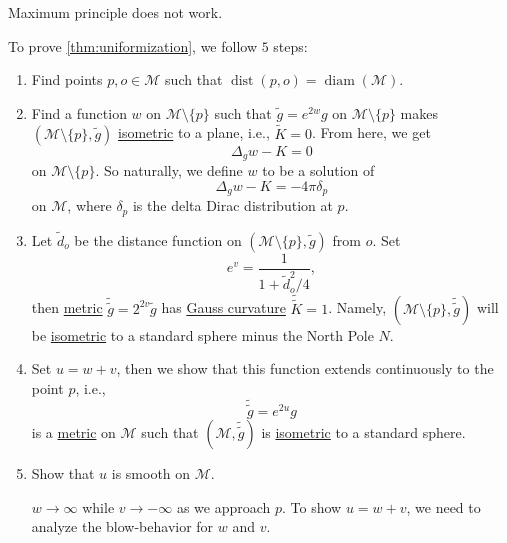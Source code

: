 \begin{note}
	Maximum principle does not work.
\end{note}

To prove \autoref{thm:uniformization}, we follow \(5\) steps:
\begin{enumerate}
	\item Find points \(p, o\in \mathcal{M} \) such that \(\mathop{\mathrm{dist}}(p, o) = \mathop{\mathrm{diam}}(\mathcal{M} ) \).
	\item Find a function \(w\) on \(\mathcal{M} \setminus \{ p \} \) such that \(\widetilde{g} = e^{2w} g\) on \(\mathcal{M} \setminus \{ p \} \) makes \((\mathcal{M} \setminus \{ p \} , \widetilde{g} )\) \hyperref[def:isometry]{isometric} to a plane, i.e., \(\widetilde{K} = 0\). From here, we get
	      \[
		      \Delta _g w - K = 0
	      \]
	      on \(\mathcal{M} \setminus \{ p \} \). So naturally, we define \(w\) to be a solution of
	      \[
		      \Delta _g w - K = -4 \pi \delta _p
	      \]
	      on \(\mathcal{M} \), where \(\delta _p\) is the delta Dirac distribution at \(p\).
	\item Let \(\widetilde{d} _o\) be the distance function on \((\mathcal{M} \setminus \{ p \} , \widetilde{g} )\) from \(o\). Set
	      \[
		      e^v = \frac{1}{1 + \widetilde{d} _o^2/4},
	      \]
	      then \hyperref[def:Riemannian-metric]{metric} \(\widetilde{\widetilde{g}} = 2^{2v} \widetilde{g} \) has \hyperref[rmk:Gauss-curvature]{Gauss curvature} \(\widetilde{\widetilde{K}} = 1\). Namely, \((\mathcal{M} \setminus \{ p \} , \widetilde{\widetilde{g}} )\) will be \hyperref[def:isometry]{isometric} to a standard sphere minus the North Pole \(N\).
	\item Set \(u = w + v\), then we show that this function extends continuously to the point \(p\), i.e.,
	      \[
		      \widetilde{\widetilde{g}} = e^{2u} g
	      \]
	      is a \hyperref[def:Riemannian-metric]{metric} on \(\mathcal{M} \) such that \((\mathcal{M} , \widetilde{\widetilde{g}} )\) is \hyperref[def:isometry]{isometric} to a standard sphere.
	\item Show that \(u\) is smooth on \(\mathcal{M} \).
	      \begin{note}
		      \(w \to \infty \) while \(v \to -\infty \) as we approach \(p\). To show \(u = w + v\), we need to analyze the blow-behavior for \(w\) and \(v\).
	      \end{note}
\end{enumerate}


